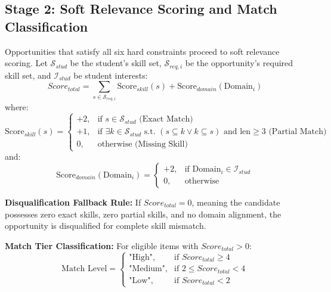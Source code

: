 \subsection{Stage 2: Soft Relevance Scoring and Match Classification}
Opportunities that satisfy all six hard constraints proceed to soft relevance scoring. Let $\mathcal{S}_{stud}$ be the student's skill set, $\mathcal{S}_{req,i}$ be the opportunity's required skill set, and $\mathcal{I}_{stud}$ be student interests:
\begin{equation}
	Score_{total} = \sum_{s \in \mathcal{S}_{req,i}} \text{Score}_{skill}(s) + \text{Score}_{domain}(\text{Domain}_i) \label{e4.5}
\end{equation}
where:
\begin{equation}
	\text{Score}_{skill}(s) = 
	\begin{cases}
		+2, & \text{if } s \in \mathcal{S}_{stud} \text{ (Exact Match)} \\
		+1, & \text{if } \exists k \in \mathcal{S}_{stud} \text{ s.t. } (s \subseteq k \lor k \subseteq s) \text{ and } \text{len} \ge 3 \text{ (Partial Match)} \\
		0, & \text{otherwise (Missing Skill)}
	\end{cases} \label{e4.6}
\end{equation}
and:
\begin{equation}
	\text{Score}_{domain}(\text{Domain}_i) = 
	\begin{cases}
		+2, & \text{if } \text{Domain}_i \in \mathcal{I}_{stud} \\
		0, & \text{otherwise}
	\end{cases} \label{e4.7}
\end{equation}

\textbf{Disqualification Fallback Rule:} If $Score_{total} = 0$, meaning the candidate possesses zero exact skills, zero partial skills, and no domain alignment, the opportunity is disqualified for complete skill mismatch.

\textbf{Match Tier Classification:} For eligible items with $Score_{total} > 0$:
\begin{equation}
	\text{Match Level} = 
	\begin{cases}
		\text{"High"}, & \text{if } Score_{total} \ge 4 \\
		\text{"Medium"}, & \text{if } 2 \le Score_{total} < 4 \\
		\text{"Low"}, & \text{if } Score_{total} < 2
	\end{cases} \label{e4.8}
\end{equation}

